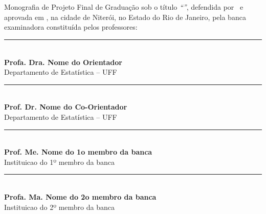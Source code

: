 \documentclass[12pt,a4paper,header]{abnt}
\begin{document}
\begin{folhadeaprovacao}

\thispagestyle{logouff}

\hspace{.2\textwidth} %
\begin{minipage}{.7\textwidth}

\begin{flushright}

{\large \bf \ABNTautordata}\\[1cm]

{\large \bf \ABNTtitulodata}\\[1cm]

\end{flushright}
Monografia de Projeto Final de Graduação sob o título \textit{``\ABNTtitulodata''},
defendida por \ABNTautordata~e aprovada em \ABNTdatadata, na cidade de Niterói,
no Estado do Rio de Janeiro, pela banca examinadora constituída pelos
professores:
\begin{flushright}

\begin{espacosimples}





\vspace{1.5cm}
\noindent\rule{10cm}{0.4pt}\\
{\bf Profa. Dra. Nome do Orientador}\\
Departamento de Estatística -- UFF\\

\vspace{1.5cm}
\noindent\rule{10cm}{0.4pt}\\
{\bf Prof. Dr. Nome do Co-Orientador}\\
Departamento de Estatística -- UFF\\

\vspace{1.5cm}
\noindent\rule{10cm}{0.4pt}\\
{\bf Prof. Me. Nome do 1o membro da banca}\\
Instituicao do 1º membro da banca\\


\vspace{1.5cm}
\noindent\rule{10cm}{0.4pt}\\
{\bf Profa. Ma. Nome do 2o membro da banca}\\
Instituicao do 2º membro da banca\\


\end{espacosimples}
\end{flushright}
\end{minipage}
\end{folhadeaprovacao}
\end{document}
